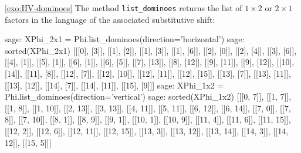 \documentclass[12pt]{amsart}
\begin{document}
\begin{exosolution}{\ref{exo:HV-dominoes}}
The method \texttt{list\_dominoes} returns the list of $1\times 2$ or $2\times
1$ factors in the language of the associated substitutive shift:
\begin{sagecommandlinetcb}
\begin{sagecommandline}
sage: XPhi_2x1 = Phi.list_dominoes(direction='horizontal')
sage: sorted(XPhi_2x1)
[[[0], [3]], [[1], [2]], [[1], [3]], [[1], [6]], [[2], [0]], [[2], [4]],
[[3], [6]], [[4], [1]], [[5], [1]], [[6], [1]], [[6], [5]], [[7], [13]],
[[8], [12]], [[9], [11]], [[9], [12]], [[10], [14]], [[11], [8]], [[12],
[7]], [[12], [10]], [[12], [11]], [[12], [15]], [[13], [7]], [[13], [11]],
[[13], [12]], [[14], [7]], [[14], [11]], [[15], [9]]]
sage: XPhi_1x2 = Phi.list_dominoes(direction='vertical')
sage: sorted(XPhi_1x2)
[[[0, 7]], [[1, 7]], [[1, 8]], [[1, 10]], [[2, 13]], [[3, 13]], [[4, 11]],
[[5, 11]], [[6, 12]], [[6, 14]], [[7, 0]], [[7, 8]], [[7, 10]], [[8, 1]],
[[8, 9]], [[9, 1]], [[10, 1]], [[10, 9]], [[11, 4]], [[11, 6]], [[11, 15]],
[[12, 2]], [[12, 6]], [[12, 11]], [[12, 15]], [[13, 3]], [[13, 12]], [[13,
14]], [[14, 3]], [[14, 12]], [[15, 5]]]
\end{sagecommandline}
\end{sagecommandlinetcb}
\end{exosolution}
\end{document}

